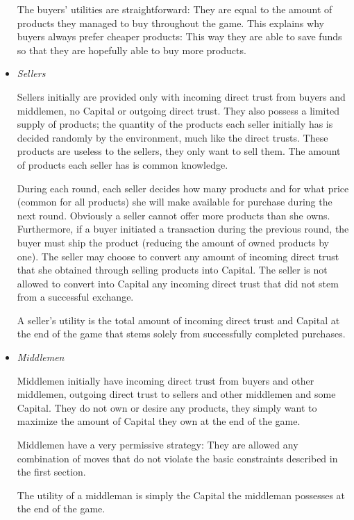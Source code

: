 \begin{itemize}
    The buyers' utilities are straightforward: They are equal to the amount of products they managed to buy throughout the
    game. This explains why buyers always prefer cheaper products: This way they are able to save funds so that they are
    hopefully able to buy more products.

    \item \textit{Sellers}

    Sellers initially are provided only with incoming direct trust from buyers and middlemen, no Capital or outgoing direct
    trust. They also possess a limited supply of products; the quantity of the products each seller initially has is decided
    randomly by the environment, much like the direct trusts. These products are useless to the sellers, they only want to
    sell them. The amount of products each seller has is common knowledge.
    
    During each round, each seller decides how many products and for what price (common for all products) she will make
    available for purchase during the next round. Obviously a seller cannot offer more products than she owns. Furthermore, if
    a buyer initiated a transaction during the previous round, the buyer must ship the product (reducing the amount of owned
    products by one). The seller may choose to convert any amount of incoming direct trust that she obtained through selling
    products into Capital. The seller is not allowed to convert into Capital any incoming direct trust that did not stem from
    a successful exchange.

    A seller's utility is the total amount of incoming direct trust and Capital at the end of the game that stems solely from
    successfully completed purchases.

    \item \textit{Middlemen}

    Middlemen initially have incoming direct trust from buyers and other middlemen, outgoing direct trust to sellers and other
    middlemen and some Capital. They do not own or desire any products, they simply want to maximize the amount of Capital
    they own at the end of the game.

    Middlemen have a very permissive strategy: They are allowed any combination of moves that do not violate the basic
    constraints described in the first section.

    The utility of a middleman is simply the Capital the middleman possesses at the end of the game.
  \end{itemize}
